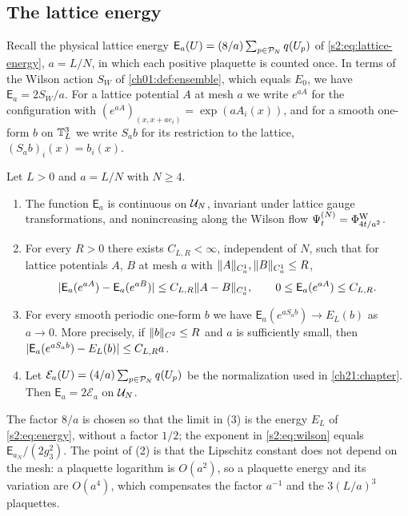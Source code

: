 \subsection{The lattice energy}

Recall the physical lattice energy $\mathsf E_a(U)=(8/a)\sum_{p\in\mathcal P_{N}}q(U_p)$ of \eqref{s2:eq:lattice-energy}, $a=L/N$, in which each positive plaquette is counted once. In terms of the Wilson action $S_W$ of \cref{ch01:def:ensemble}, which equals $E_0$, we have $\mathsf E_a=2S_W/a$. For a lattice potential $A$ at mesh $a$ we write $e^{aA}$ for the configuration with $(e^{aA})_{(x,x+ae_i)}=\exp(aA_i(x))$, and for a smooth one-form $b$ on $\mathbb T_L^3$ we write $S_ab$ for its restriction to the lattice, $(S_ab)_i(x)=b_i(x)$.

\begin{lemma}\label{ch26:lem:lattice-energy-supplier}
Let $L>0$ and $a=L/N$ with $N\ge4$.
\begin{enumerate}
\item The function $\mathsf E_a$ is continuous on $\mathcal U_{N}$, invariant under lattice gauge transformations, and nonincreasing along the Wilson flow $\Psi^{(N)}_t=\Phi^{\mathrm W}_{4t/a^2}$.
\item For every $R>0$ there exists $C_{L,R}<\infty$, independent of $N$, such that for lattice potentials $A$, $B$ at mesh $a$ with $\lVert A\rVert_{C_a^1},\lVert B\rVert_{C_a^1}\le R$,
\[
 \lvert \mathsf E_a(e^{aA})-\mathsf E_a(e^{aB})\rvert\le C_{L,R}\lVert A-B\rVert_{C_a^1},\qquad 0\le\mathsf E_a(e^{aA})\le C_{L,R}.
\]
\item For every smooth periodic one-form $b$ we have $\mathsf E_a(e^{aS_ab})\to E_L(b)$ as $a\to0$. More precisely, if $\lVert b\rVert_{C^2}\le R$ and $a$ is sufficiently small, then $\lvert \mathsf E_a(e^{aS_ab})-E_L(b)\rvert\le C_{L,R}a$.
\item Let $\mathcal E_a(U)=(4/a)\sum_{p\in\mathcal P_{N}}q(U_p)$ be the normalization used in \cref{ch21:chapter}. Then $\mathsf E_a=2\mathcal E_a$ on $\mathcal U_{N}$.
\end{enumerate}
\end{lemma}

The factor $8/a$ is chosen so that the limit in (3) is the energy $E_L$ of \eqref{s2:eq:energy}, without a factor $1/2$; the exponent in \eqref{s2:eq:wilson} equals $\mathsf E_{a_N}/(2g_3^2)$. The point of (2) is that the Lipschitz constant does not depend on the mesh: a plaquette logarithm is $O(a^2)$, so a plaquette energy and its variation are $O(a^4)$, which compensates the factor $a^{-1}$ and the $3(L/a)^3$ plaquettes.

